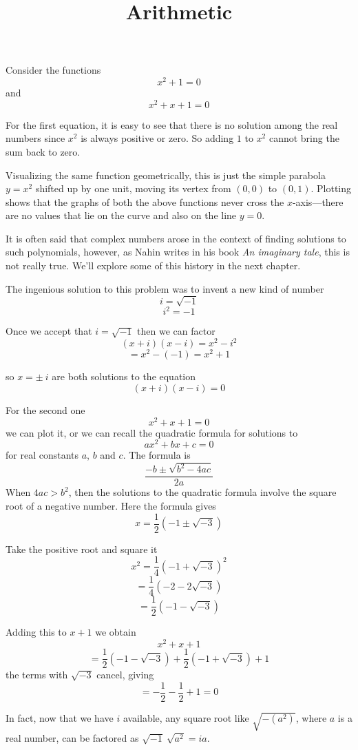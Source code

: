 \documentclass[11pt, oneside]{article}
\title{Arithmetic}
\date{}
\begin{document}
\maketitle
\Large

Consider the functions
\[ x^2 + 1 = 0 \]
and
\[ x^2 + x + 1 = 0 \]

For the first equation, it is easy to see that there is no solution among the real numbers since $x^2$ is always positive or zero.  So adding $1$ to $x^2$ cannot bring the sum back to zero.

Visualizing the same function geometrically, this is just the simple parabola $y=x^2$ shifted up by one unit, moving its vertex from $(0,0)$ to $(0,1)$.  Plotting shows that the graphs of both the above functions never cross the $x$-axis---there are no values that lie on the curve and also on the line $y=0$.

It is often said that complex numbers arose in the context of finding solutions to such polynomials, however, as Nahin writes in his book \emph{An imaginary tale}, this is not really true.  We'll explore some of this history in the next chapter.

The ingenious solution to this problem was to invent a new kind of number
\[ i = \sqrt{-1} \]
\[ i^2 = -1 \]

Once we accept that $i = \sqrt{-1}$
then we can factor
\[ (x + i)(x - i) = x^2 - i^2 \]
\[ = x^2 - (-1) = x^2 + 1 \]

so $x = \pm \ i$ are both solutions to the equation 
\[ (x + i)(x - i) = 0 \]

For the second one
\[ x^2 + x + 1 = 0 \]
we can plot it, or we can recall the quadratic formula for solutions to
\[ ax^2 + bx + c = 0 \]
for real constants $a$, $b$ and $c$.  The formula is
\[ \frac{-b \pm \sqrt{b^2 - 4ac}}{2a} \]
When $4ac > b^2$, then the solutions to the quadratic formula involve the square root of a negative number.  Here the formula gives
\[ x = \frac{1}{2} (-1 \pm \sqrt{-3}) \]

Take the positive root and square it
\[ x^2 = \frac{1}{4} (-1 + \sqrt{-3})^2 \]
\[ = \frac{1}{4} (-2 - 2 \sqrt{-3}) \]
\[ =  \frac{1}{2} (-1 - \sqrt{-3})  \]

Adding this to $x+1$ we obtain
\[ x^2 + x + 1 \]
\[ = \frac{1}{2} (-1 - \sqrt{-3}) +  \frac{1}{2} (-1 + \sqrt{-3}) + 1 \]
the terms with $\sqrt{-3}$ cancel, giving
\[ = -\frac{1}{2} - \frac{1}{2} + 1 = 0 \]

In fact, now that we have $i$ available, any square root like $\sqrt{-(a^2)}$, where $a$ is a real number, can be factored as $\sqrt{-1} \ \sqrt{a^2} = ia$.
\end{document}
